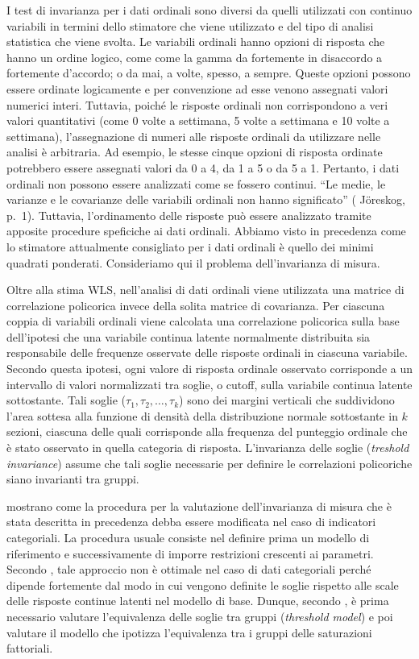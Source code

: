 \documentclass[
  11pt,
]{krantz}
\theoremstyle{definition}
\theoremstyle{definition}
\theoremstyle{definition}
\theoremstyle{definition}
\theoremstyle{remark}
\begin{document}
I test di invarianza per i dati ordinali sono diversi da quelli utilizzati con continuo variabili in termini dello stimatore che viene utilizzato e del tipo di analisi statistica che viene svolta. Le variabili ordinali hanno opzioni di risposta che hanno un ordine logico, come come la gamma da fortemente in disaccordo a fortemente d'accordo; o da mai, a volte, spesso, a sempre. Queste opzioni possono essere ordinate logicamente e per convenzione ad esse venono assegnati valori numerici interi. Tuttavia, poiché le risposte ordinali non corrispondono a veri valori quantitativi (come 0 volte a settimana, 5 volte a settimana e 10 volte a settimana), l'assegnazione di numeri alle risposte ordinali da utilizzare nelle analisi è arbitraria. Ad esempio, le stesse cinque opzioni di risposta ordinate potrebbero essere assegnati valori da 0 a 4, da 1 a 5 o da 5 a 1. Pertanto, i dati ordinali non possono essere analizzati come se fossero continui. ``Le medie, le varianze e le covarianze delle variabili ordinali non hanno significato'' ( Jöreskog, p.~1). Tuttavia, l'ordinamento delle risposte può essere analizzato tramite apposite procedure speficiche ai dati ordinali. Abbiamo visto in precedenza come lo stimatore attualmente consigliato per i dati ordinali è quello dei minimi quadrati ponderati. Consideriamo qui il problema dell'invarianza di misura.

Oltre alla stima WLS, nell'analisi di dati ordinali viene utilizzata una matrice di correlazione policorica invece della solita matrice di covarianza. Per ciascuna coppia di variabili ordinali viene calcolata una correlazione policorica sulla base dell'ipotesi che una variabile continua latente normalmente distribuita sia responsabile delle frequenze osservate delle risposte ordinali in ciascuna variabile. Secondo questa ipotesi, ogni valore di risposta ordinale osservato corrisponde a un intervallo di valori normalizzati tra soglie, o cutoff, sulla variabile continua latente sottostante. Tali soglie (\(\tau_1, \tau_2, \dots, \tau_k\)) sono dei margini verticali che suddividono l'area sottesa alla funzione di densità della distribuzione normale sottostante in \(k\) sezioni, ciascuna delle quali corrisponde alla frequenza del punteggio ordinale che è stato osservato in quella categoria di risposta. L'invarianza delle soglie (\emph{treshold invariance}) assume che tali soglie necessarie per definire le correlazioni policoriche siano invarianti tra gruppi.

\citet{wu2016identification} mostrano come la procedura per la valutazione dell'invarianza di misura che è stata descritta in precedenza debba essere modificata nel caso di indicatori categoriali. La procedura usuale consiste nel definire prima un modello di riferimento e successivamente di imporre restrizioni crescenti ai parametri. Secondo \citet{wu2016identification}, tale approccio non è ottimale nel caso di dati categoriali perché dipende fortemente dal modo in cui vengono definite le soglie rispetto alle scale delle risposte continue latenti nel modello di base. Dunque, secondo \citet{wu2016identification}, è prima necessario valutare l'equivalenza delle soglie tra gruppi (\emph{threshold model}) e poi valutare il modello che ipotizza l'equivalenza tra i gruppi delle saturazioni fattoriali.
\end{document}
